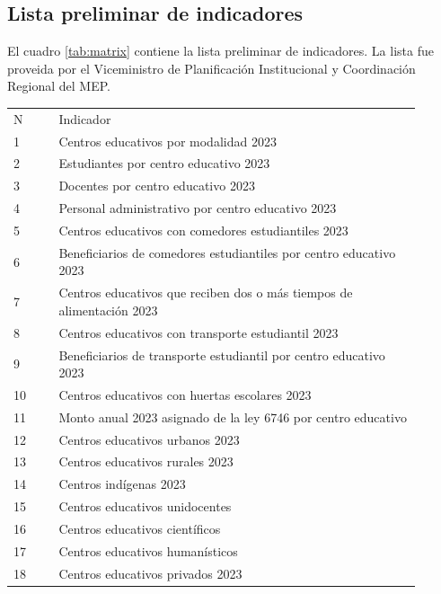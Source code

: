 \documentclass{article}
\begin{document}
\begin{multicols}{6}[]
\section{Lista preliminar de indicadores}

El cuadro \ref{tab:matrix} contiene la lista preliminar de indicadores. La lista fue proveida por el Viceministro de Planificaci\'on Institucional y Coordinaci\'on Regional del MEP.

\begin{center}
	\label{tab:matrix}
	\begin{tabular}{p{0.1\linewidth}p{0.8\linewidth}}
		\rowcolor{gray!40}
		N & Indicador \\
		1 & Centros educativos por modalidad 2023 \\
		2 & Estudiantes por centro educativo 2023 \\
		3 & Docentes por centro educativo 2023 \\
		4 & Personal administrativo por centro educativo 2023 \\
		5 & Centros educativos con comedores estudiantiles 2023 \\
		6 & Beneficiarios de comedores estudiantiles por centro educativo 2023 \\
		7 & Centros educativos que reciben dos o m\'as tiempos de alimentaci\'on 2023 \\
		8 & Centros educativos con transporte estudiantil 2023 \\
		9 & Beneficiarios de transporte estudiantil por centro educativo 2023 \\
		10 & Centros educativos con huertas escolares 2023 \\
		11 & Monto anual 2023 asignado de la ley 6746 por centro educativo \\
		12 & Centros educativos urbanos 2023 \\
		13 & Centros educativos rurales 2023 \\
		14 & Centros ind\'igenas 2023 \\
		15 & Centros educativos unidocentes \\
		16 & Centros educativos cient\'ificos \\
		17 & Centros educativos human\'isticos \\
		18 & Centros educativos privados 2023 \\

\end{tabular}
\end{center}
\end{multicols}
\end{document}
